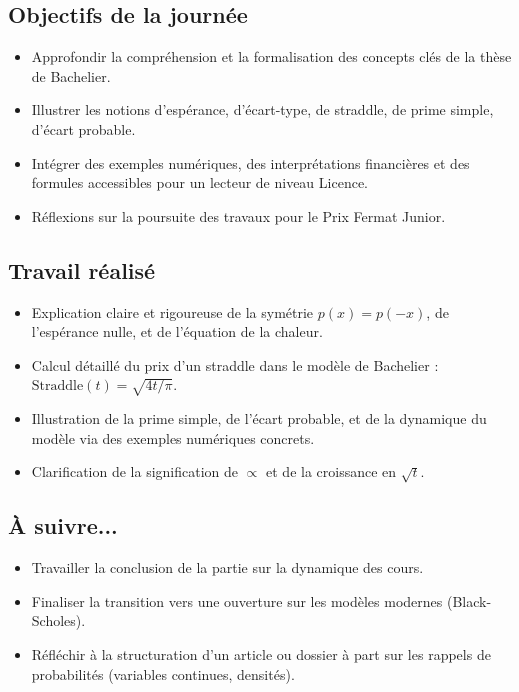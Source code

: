 \documentclass[a4paper,11pt]{article}
\begin{document}
\subsection{Objectifs de la journée}
\begin{itemize}
    \item Approfondir la compréhension et la formalisation des concepts clés de la thèse de Bachelier.
    \item Illustrer les notions d’espérance, d’écart-type, de straddle, de prime simple, d’écart probable.
    \item Intégrer des exemples numériques, des interprétations financières et des formules accessibles pour un lecteur de niveau Licence.
    \item Réflexions sur la poursuite des travaux pour le Prix Fermat Junior.
\end{itemize}

\subsection{Travail réalisé}
\begin{itemize}
    \item Explication claire et rigoureuse de la symétrie \( p(x) = p(-x) \), de l’espérance nulle, et de l’équation de la chaleur.
    \item Calcul détaillé du prix d’un straddle dans le modèle de Bachelier : \( \text{Straddle}(t) = \sqrt{4t/\pi} \).
    \item Illustration de la prime simple, de l’écart probable, et de la dynamique du modèle via des exemples numériques concrets.
    \item Clarification de la signification de \( \propto \) et de la croissance en \( \sqrt{t} \).
\end{itemize}

\subsection{À suivre...}
\begin{itemize}
    \item Travailler la conclusion de la partie sur la dynamique des cours.
    \item Finaliser la transition vers une ouverture sur les modèles modernes (Black-Scholes).
    \item Réfléchir à la structuration d’un article ou dossier à part sur les rappels de probabilités (variables continues, densités).
\end{itemize}
\end{document}
